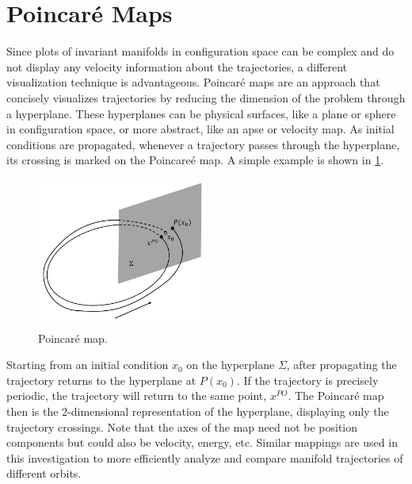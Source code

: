 \section{Poincar\'e Maps}
Since plots of invariant manifolds in configuration space can be complex and do not display any
velocity information about the trajectories, a different visualization technique is advantageous.
Poincar\'e maps are an approach that concisely visualizes trajectories by reducing the dimension of
the problem through a hyperplane. These hyperplanes can be physical surfaces, like a plane or
sphere in configuration space, or more abstract, like an apse or velocity map. As initial
conditions are propagated, whenever a trajectory passes through the hyperplane, its crossing is
marked on the Poincare\'e map. A simple example is shown in \cref{fig:map}.

\begin{figure}[ht]
    \centering
    \includegraphics[width=0.5\textwidth]{figures/Map.jpg}
    \caption{Poincar\'e map.}
    \label{fig:map}
\end{figure}

Starting from an initial condition $x_{0}$ on the hyperplane $\Sigma$, after propagating the
trajectory returns to the hyperplane at $P(x_{0})$. If the trajectory is precisely periodic, the
trajectory will return to the same point, $x^{PO}$. The Poincar\'e map then is the 2-dimensional
representation of the hyperplane, displaying only the trajectory crossings. Note that the axes of
the map need not be position components but could also be velocity, energy, etc. Similar mappings
are used in this investigation to more efficiently analyze and compare manifold trajectories of
different orbits.
